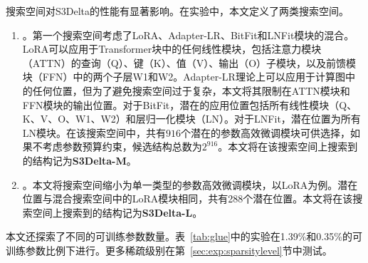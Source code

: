 搜索空间对S3Delta的性能有显著影响。在实验中，本文定义了两类搜索空间。

\begin{enumerate}
\item {}。第一个搜索空间考虑了LoRA、Adapter-LR、BitFit和LNFit模块的混合。LoRA可以应用于Transformer块中的任何线性模块，包括注意力模块（ATTN）的查询（Q）、键（K）、值（V）、输出（O）子模块，以及前馈模块（FFN）中的两个子层W1和W2。Adapter-LR理论上可以应用于计算图中的任何位置，但为了避免搜索空间过于复杂，本文将其限制在ATTN模块和FFN模块的输出位置。对于BitFit，潜在的应用位置包括所有线性模块（Q、K、V、O、W1、W2）和层归一化模块（LN）。对于LNFit，潜在位置为所有LN模块。在该搜索空间中，共有$916$个潜在的参数高效微调模块可供选择，如果不考虑参数预算约束，候选结构总数为$2^{916}$。本文将在该搜索空间上搜索到的结构记为\textbf{S3Delta-M}。

\item {}。本文将搜索空间缩小为单一类型的参数高效微调模块，以LoRA为例。潜在位置与混合搜索空间中的LoRA模块相同，共有288个潜在位置。本文将在该搜索空间上搜索到的结构记为\textbf{S3Delta-L}。

\end{enumerate}

本文还探索了不同的可训练参数数量。表~\ref{tab:glue}中的实验在1.39\%和0.35\%的可训练参数比例下进行。更多稀疏级别在第~\ref{sec:exp:sparsitylevel}节中测试。




\newcommand{\femph}[1]{\cellcolor[HTML]{C5E0B4}{#1}}
\newcommand{\semph}[1]{\cellcolor[HTML]{CFE2F3}{#1}}

\newcommand{\crect}[1]{{\begin{tikzpicture}
\node[rectangle,
    draw = themeyellow,
    fill = themedarkyellow,
    inner sep=0pt,
    line width = 0.03cm,
    minimum width = #1 cm, 
    minimum height = 0.25 cm] at (0,0) {};
\end{tikzpicture}} 
}

